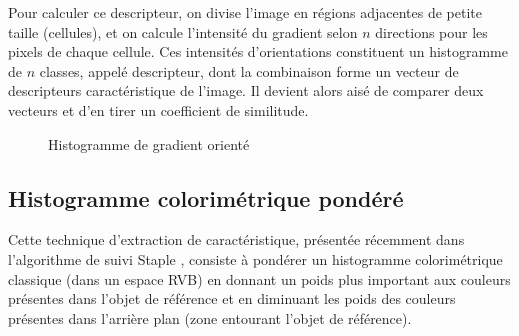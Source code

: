         Pour calculer ce descripteur, on divise l'image en régions adjacentes de petite taille (cellules), et on calcule l'intensité du gradient selon $n$ directions pour les pixels de chaque cellule.
        Ces intensités d'orientations constituent un histogramme de $n$ classes, appelé descripteur, dont la combinaison forme un vecteur de descripteurs caractéristique de l'image.
        Il devient alors aisé de comparer deux vecteurs et d'en tirer un coefficient de similitude.
        
		      \begin{figure}[H]
			  \centering
			  \caption{ Histogramme de gradient orienté }
			  \label{fig:c2p2s2_hog}
		      \end{figure}
			  
        \subsection{Histogramme colorimétrique pondéré}
        
        Cette technique d'extraction de caractéristique, présentée récemment dans l'algorithme de suivi Staple \cite{Bib_STAPLE}, consiste à pondérer un histogramme colorimétrique classique (dans un espace RVB) en donnant un poids plus important aux couleurs présentes dans l'objet de référence et en diminuant les poids des couleurs présentes dans l'arrière plan (zone entourant l'objet de référence).
        
